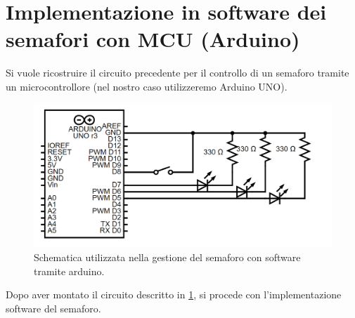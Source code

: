 \documentclass[10pt, a4paper, italian]{article}
\begin{document}
\section{Implementazione in software dei semafori con MCU (Arduino)}
Si vuole ricostruire il circuito precedente per il controllo di un semaforo tramite un microcontrollore (nel nostro caso utilizzeremo Arduino UNO).
\begin{figure}[htbp]
    \centering
    \includegraphics[width=\textwidth]{schem_ard}
    \caption{Schematica utilizzata nella gestione del semaforo con software tramite arduino.
    \label{schem: arduino}}
\end{figure}
Dopo aver montato il circuito descritto in \cref{schem: arduino}, si procede con l'implementazione software del semaforo.
\end{document}
